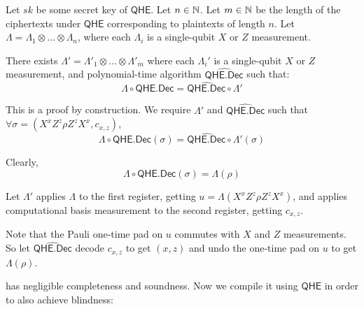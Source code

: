 \begin{thm}
	\label{decodeMeasureOrder}
	Let $sk$ be some secret key of $\mathsf{QHE}$.
	Let $n\in\mathbb{N}$.
	Let $m\in\mathbb{N}$ be the length of the ciphertexts under $\mathsf{QHE}$ corresponding to plaintexts of length $n$.
	Let $\Lambda=\Lambda_1\otimes\ldots\otimes\Lambda_n$, where each $\Lambda_i$ is a single-qubit $X$ or $Z$ measurement.

	There exists $\Lambda'=\Lambda'_1\otimes\ldots\otimes\Lambda'_m$ where each $\Lambda_i'$ is a single-qubit $X$ or $Z$ measurement, and polynomial-time algorithm $\widehat{\mathsf{QHE.Dec}}$ such that:
	$$\Lambda\circ\mathsf{QHE.Dec}=\widehat{\mathsf{QHE.Dec}}\circ\Lambda'$$
\end{thm}
\begin{prf}
	This is a proof by construction.
	We require $\Lambda'$ and $\widehat{\mathsf{QHE.Dec}}$ such that $\forall\sigma=(X^xZ^z\rho Z^zX^x, c_{x,z})$,
	$$\Lambda\circ\mathsf{QHE.Dec}(\sigma)=\widehat{\mathsf{QHE.Dec}}\circ\Lambda'(\sigma)$$

	Clearly,
	$$\Lambda\circ\mathsf{QHE.Dec}(\sigma)=\Lambda(\rho)$$
	
	Let $\Lambda'$ applies $\Lambda$ to the first register, getting $u=\Lambda(X^xZ^z\rho Z^zX^x)$, and applies computational basis measurement to the second register, getting $c_{x, z}$.

	Note that the Pauli one-time pad on $u$ commutes with $X$ and $Z$ measurements.
	So let $\widehat{\mathsf{QHE.Dec}}$ decode $c_{x, z}$ to get $(x, z)$ and undo the one-time pad on $u$ to get $\Lambda(\rho)$.
\end{prf}


 has negligible completeness and soundness.
Now we compile it using $\mathsf{QHE}$ in order to also achieve blindness:

